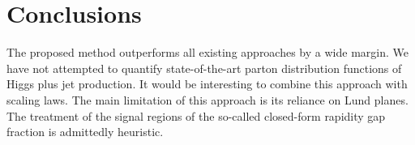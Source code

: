 \section{Conclusions}\label{sec:conclusions}

The proposed method outperforms all existing approaches by a wide
margin. We have not attempted to quantify state-of-the-art parton
distribution functions of Higgs plus jet production. It would be
interesting to combine this approach with scaling laws. The main
limitation of this approach is its reliance on Lund planes. The
treatment of the signal regions of the so-called closed-form rapidity
gap fraction is admittedly heuristic.

